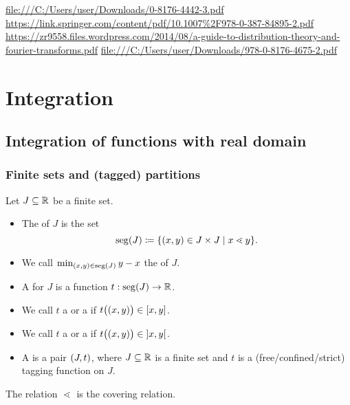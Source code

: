 \url{file:///C:/Users/user/Downloads/0-8176-4442-3.pdf}
\url{https://link.springer.com/content/pdf/10.1007%2F978-0-387-84895-2.pdf}
\url{https://zr9558.files.wordpress.com/2014/08/a-guide-to-distribution-theory-and-fourier-transforms.pdf}
\url{file:///C:/Users/user/Downloads/978-0-8176-4675-2.pdf}

\chapter{Integration}

\section{Integration of functions with real domain}
\subsection{Finite sets and (tagged) partitions}
\begin{definition}
Let $J \subseteq \mathbb{R}$ be a finite set. 
\begin{itemize}
\item The  of $J$ is the set
\[ \seg(J) \defeq \setbuilder{(x,y)\in J\times J}{x \lessdot y}. \]
\item We call $\min_{(x,y) \in \operatorname{seg}(J)}y-x$ the  of $J$.
\item A  for $J$ is a function $t: \operatorname{seg}(J) \to \mathbb{R}$.
\item We call $t$ a  or a  if $t\big((x,y)\big) \in \interval{x,y}$.
\item We call $t$ a  or a  if $t\big((x,y)\big) \in \interval[o]{x,y}$.
\item A  is a pair $\sSet{J, t}$, where $J\subseteq \mathbb{R}$ is a finite set and $t$ is a (free/confined/strict) tagging function on $J$.
\end{itemize}
\end{definition}
The relation $\lessdot$ is the covering relation.

